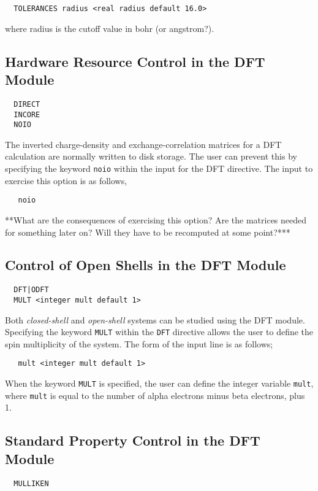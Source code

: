 \begin{verbatim}
  TOLERANCES radius <real radius default 16.0>
\end{verbatim}

where radius is the cutoff value in bohr (or angstrom?).


\subsection{Hardware Resource Control in the DFT Module}
\begin{verbatim}
  DIRECT
  INCORE
  NOIO
\end{verbatim}

The inverted charge-density and exchange-correlation matrices
for a DFT calculation are normally written to disk storage.  The user
can prevent this by specifying the keyword \verb+noio+ within the
input for the DFT directive.  The input to exercise this option is
as follows,

\begin{verbatim}
   noio
\end{verbatim}

\Large
**What are the consequences of exercising this option?  Are the matrices
needed for something later on?  Will they have to be recomputed at some
point?***
\normalsize


\subsection{Control of Open Shells in the DFT Module}
\begin{verbatim}
  DFT|ODFT
  MULT <integer mult default 1>
\end{verbatim}

Both {\sl closed-shell} and {\sl open-shell} systems can be studied using
the DFT module.  Specifying the keyword \verb+MULT+ within the \verb+DFT+
directive allows the user to define the spin multiplicity of the system.
The form of the input line is as follows;

\begin{verbatim}
   mult <integer mult default 1> 
\end{verbatim}

When the keyword \verb+MULT+ is specified, the user can define the integer
variable \verb+mult+, where \verb+mult+ is equal to the number of alpha 
electrons minus beta electrons, plus 1.

\subsection{Standard Property Control in the DFT Module}
\begin{verbatim}
  MULLIKEN
\end{verbatim}


